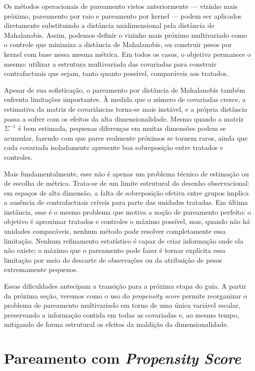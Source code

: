 Os métodos operacionais de pareamento vistos anteriormente — vizinho mais próximo, pareamento por raio e pareamento por kernel — podem ser aplicados diretamente substituindo a distância unidimensional pela distância de Mahalanobis. Assim, podemos definir o vizinho mais próximo multivariado como o controle que minimiza a distância de Mahalanobis, ou construir pesos por kernel com base nessa mesma métrica. Em todos os casos, o objetivo permanece o mesmo: utilizar a estrutura multivariada das covariadas para construir contrafactuais que sejam, tanto quanto possível, comparáveis aos tratados.

Apesar de sua sofisticação, o pareamento por distância de Mahalanobis também enfrenta limitações importantes. À medida que o número de covariadas cresce, a estimativa da matriz de covariâncias torna-se mais instável, e a própria distância passa a sofrer com os efeitos da alta dimensionalidade. Mesmo quando a matriz $\Sigma^{-1}$ é bem estimada, pequenas diferenças em muitas dimensões podem se acumular, fazendo com que pares realmente próximos se tornem raros, ainda que cada covariada isoladamente apresente boa sobreposição entre tratados e controles.

Mais fundamentalmente, esse não é apenas um problema técnico de estimação ou de escolha de métrica. Trata-se de um limite estrutural do desenho observacional: em espaços de alta dimensão, a falta de sobreposição efetiva entre grupos implica a ausência de contrafactuais críveis para parte das unidades tratadas. Em última instância, esse é o mesmo problema que motiva a noção de pareamento perfeito: o objetivo é aproximar tratados e controles o máximo possível, mas, quando não há unidades comparáveis, nenhum método pode resolver completamente essa limitação. Nenhum refinamento estatístico é capaz de criar informação onde ela não existe; o máximo que o pareamento pode fazer é tornar explícita essa limitação por meio do descarte de observações ou da atribuição de pesos extremamente pequenos.


Essas dificuldades antecipam a transição para a próxima etapa do guia. A partir da próxima seção, veremos como o uso do \textit{propensity score} permite reorganizar o problema de pareamento multivariado em torno de uma única variável escalar, preservando a informação contida em todas as covariadas e, ao mesmo tempo, mitigando de forma estrutural os efeitos da maldição da dimensionalidade.

\section{Pareamento com \textit{Propensity Score}}

